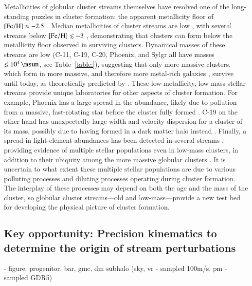 \documentclass[final,5p,times,twocolumn,authoryear]{elsarticle}
\begin{document}
Metallicities of globular cluster streams themselves have resolved one of the long-standing puzzles in cluster formation: the apparent metallicity floor of ${[\mathrm{Fe}/\mathrm{H}]}\approx-2.5$ \citep[e.g.,][]{harris:1996,harris:2010,beasley:2019}.
Median metallicities of cluster streams are low \citep[$\feh\lesssim-1$,][]{martin:2022b}, with several streams below ${[\mathrm{Fe}/\mathrm{H}]}\lesssim-3$ \citep{roederer:2019,wan:2020,martin:2022a}, demonstrating that clusters can form below the metallicity floor observed in surviving clusters.
Dynamical masses of these streams are low (C-11, C-19, C-20, Phoenix, and Sylgr all have masses $\lesssim10^4\,\unit{\msun}$, see Table~\ref{table:}), suggesting that only more massive clusters, which form in more massive, and therefore more metal-rich galaxies \citep[e.g.,][]{maiolino:2019}, survive until today, as theoretically predicted by \citet{kruijssen:2019}.
These low-metallicity, low-mass stellar streams provide unique laboratories for other aspects of cluster formation.
For example, Phoenix has a large spread in the  abundance, likely due to pollution from a massive, fast-rotating star before the cluster fully formed \citep{casey:2021}.
C-19 on the other hand has unexpectedly large width and velocity dispersion for a cluster of its mass, possibly due to having formed in a dark matter halo instead \citep{errani:2022}.
Finally, a spread in light-element abundances has been detected in several streams \citep{martin:2022a,balbinot:2022,usman:2024}, providing evidence of multiple stellar populations even in low-mass clusters, in addition to their ubiquity among the more massive globular clusters \citep[e.g.,][]{gratton:2012}.
It is uncertain to what extent these multiple stellar populations are due to various polluting processes \citep[e.g., massive AGB stars, fast-rotating massive stars, supermassive stars,][]{bastian:2018} and diluting processes \citep[e.g., stellar mass-loss, interactive binaries, re-accretion,][]{gratton:2019} operating during cluster formation.
The interplay of these processes may depend on both the age and the mass of the cluster, so globular cluster streams---old and low-mass---provide a new test bed for developing the physical picture of cluster formation.


\subsection{Key opportunity: Precision kinematics to determine the origin of stream perturbations}
- figure: progenitor, bar, gmc, dm subhalo (sky, vr - sampled 100m/s, pm - sampled GDR5)
\end{document}

